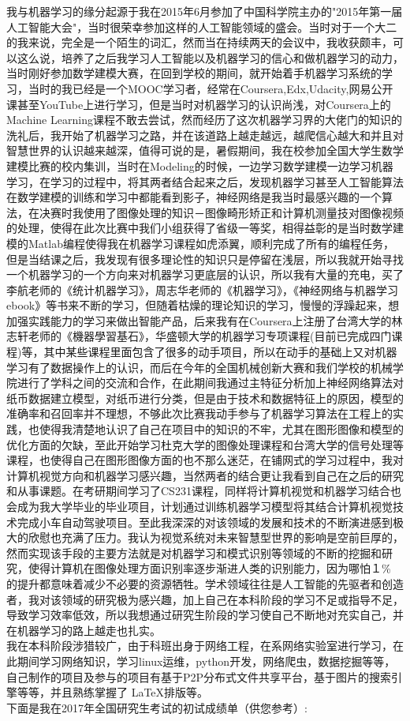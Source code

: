 \documentclass[UTF8,a4paper]{ctexart}
\begin{document}
\indent 我与机器学习的缘分起源于我在2015年6月参加了中国科学院主办的"2015年第一届人工智能大会"，当时很荣幸参加这样的人工智能领域的盛会。当时对于一个大二的我来说，完全是一个陌生的词汇，然而当在持续两天的会议中，我收获颇丰，可以这么说，培养了之后我学习人工智能以及机器学习的信心和做机器学习的动力，当时刚好参加数学建模大赛，在回到学校的期间，就开始着手机器学习系统的学习，当时的我已经是一个MOOC学习者，经常在Coursera,Edx,Udacity,网易公开课甚至YouTube上进行学习，但是当时对机器学习的认识尚浅，对Coursera上的Machine Learning课程不敢去尝试，然而经历了这次机器学习界的大佬门的知识的洗礼后，我开始了机器学习之路，并在该道路上越走越远，越爬信心越大和并且对智慧世界的认识越来越深，值得可说的是，暑假期间，我在校参加全国大学生数学建模比赛的校内集训，当时在Modeling的时候，一边学习数学建模一边学习机器学习，在学习的过程中，将其两者结合起来之后，发现机器学习甚至人工智能算法在数学建模的训练和学习中都能看到影子，神经网络是我当时最感兴趣的一个算法，在决赛时我使用了图像处理的知识－图像畸形矫正和计算机测量技对图像视频的处理，使得在此次比赛中我们小组获得了省级一等奖，相得益彰的是当时数学建模的Matlab编程使得我在机器学习课程如虎添翼，顺利完成了所有的编程任务，但是当结课之后，我发现有很多理论性的知识只是停留在浅层，所以我就开始寻找一个机器学习的一个方向来对机器学习更底层的认识，所以我有大量的充电，买了李航老师的《统计机器学习》，周志华老师的《机器学习》，《神经网络与机器学习ebook》等书来不断的学习，但随着枯燥的理论知识的学习，慢慢的浮躁起来，想加强实践能力的学习来做出智能产品，后来我有在Coursera上注册了台湾大学的林志轩老师的《機器學習基石》，华盛顿大学的机器学习专项课程(目前已完成四门课程)等，其中某些课程里面包含了很多的动手项目，所以在动手的基础上又对机器学习有了数据操作上的认识，而后在今年的全国机械创新大赛和我们学校的机械学院进行了学科之间的交流和合作，在此期间我通过主特征分析加上神经网络算法对纸币数据建立模型，对纸币进行分类，但是由于技术和数据特征上的原因，模型的准确率和召回率并不理想，不够此次比赛我动手参与了机器学习算法在工程上的实践，也使得我清楚地认识了自己在项目中的知识的不牢，尤其在图形图像和模型的优化方面的欠缺，至此开始学习杜克大学的图像处理课程和台湾大学的信号处理等课程，也使得自己在图形图像方面的也不那么迷茫，在铺网式的学习过程中，我对计算机视觉方向和机器学习感兴趣，当然两者的结合更让我看到自己在之后的研究和从事课题。在考研期间学习了CS231课程，同样将计算机视觉和机器学习结合也会成为我大学毕业的毕业项目，计划通过训练机器学习模型将其结合计算机视觉技术完成小车自动驾驶项目。至此我深深的对该领域的发展和技术的不断演进感到极大的欣慰也充满了压力。我认为视觉系统对未来智慧型世界的影响是空前巨厚的，然而实现该手段的主要方法就是对机器学习和模式识别等领域的不断的挖掘和研究，使得计算机在图像处理方面识别率逐步渐进人类的识别能力，因为哪怕１\% 的提升都意味着减少不必要的资源牺牲。学术领域往往是人工智能的先驱者和创造者，我对该领域的研究极为感兴趣，加上自己在本科阶段的学习不足或指导不足，导致学习效率低效，所以我想通过研究生阶段的学习使自己不断地对充实自己，并在机器学习的路上越走也扎实。\\
\indent 我在本科阶段涉猎较广，由于科班出身于网络工程，在系网络实验室进行学习，在此期间学习网络知识，学习linux运维，python开发，网络爬虫，数据挖掘等等，自己制作的项目及参与的项目有基于P2P分布式文件共享平台，基于图片的搜索引擎等等，并且熟练掌握了 \LaTeX 排版等。\\
\indent 下面是我在2017年全国研究生考试的初试成绩单（供您参考）:
\end{document}
